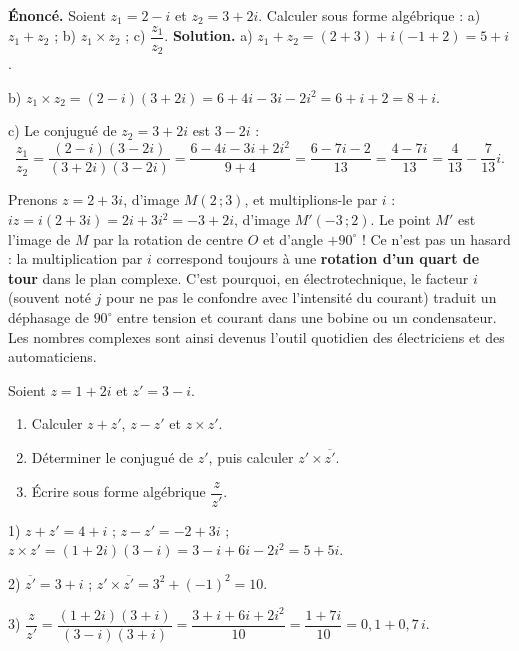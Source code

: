 \documentclass[11pt]{article}
\begin{document}
\begin{exoresolu}
\textbf{Énoncé.} Soient $z_1 = 2 - i$ et $z_2 = 3 + 2i$. Calculer sous forme algébrique : a) $z_1 + z_2$ ; b) $z_1 \times z_2$ ; c) $\dfrac{z_1}{z_2}$.
\tcblower
\textbf{Solution.}
a) $z_1 + z_2 = (2+3) + i(-1+2) = 5 + i$.

b) $z_1 \times z_2 = (2-i)(3+2i) = 6 + 4i - 3i - 2i^2 = 6 + i + 2 = 8 + i$.

c) Le conjugué de $z_2 = 3+2i$ est $3-2i$ :
\[ \frac{z_1}{z_2} = \frac{(2-i)(3-2i)}{(3+2i)(3-2i)} = \frac{6 - 4i - 3i + 2i^2}{9+4} = \frac{6 - 7i - 2}{13} = \frac{4 - 7i}{13} = \frac{4}{13} - \frac{7}{13}i. \]
\end{exoresolu}

\begin{savaistu}
Prenons $z = 2 + 3i$, d'image $M(2\,;3)$, et multiplions-le par $i$ : $iz = i(2+3i) = 2i + 3i^2 = -3 + 2i$, d'image $M'(-3\,;2)$. Le point $M'$ est l'image de $M$ par la rotation de centre $O$ et d'angle $+90^{\circ}$ ! Ce n'est pas un hasard : la multiplication par $i$ correspond toujours à une \textbf{rotation d'un quart de tour} dans le plan complexe. C'est pourquoi, en électrotechnique, le facteur $i$ (souvent noté $j$ pour ne pas le confondre avec l'intensité du courant) traduit un déphasage de $90^{\circ}$ entre tension et courant dans une bobine ou un condensateur. Les nombres complexes sont ainsi devenus l'outil quotidien des électriciens et des automaticiens.
\end{savaistu}

\begin{exercice}
Soient $z = 1 + 2i$ et $z' = 3 - i$.
\begin{enumerate}
\item Calculer $z + z'$, $z - z'$ et $z \times z'$.
\item Déterminer le conjugué de $z'$, puis calculer $z' \times \overline{z'}$.
\item Écrire sous forme algébrique $\dfrac{z}{z'}$.
\end{enumerate}
\end{exercice}

\begin{corrige}[Exercice]
1) $z + z' = 4 + i$ ; $z - z' = -2 + 3i$ ; $z \times z' = (1+2i)(3-i) = 3 - i + 6i - 2i^2 = 5 + 5i$.

2) $\overline{z'} = 3 + i$ ; $z' \times \overline{z'} = 3^2 + (-1)^2 = 10$.

3) $\dfrac{z}{z'} = \dfrac{(1+2i)(3+i)}{(3-i)(3+i)} = \dfrac{3 + i + 6i + 2i^2}{10} = \dfrac{1 + 7i}{10} = 0{,}1 + 0{,}7\,i$.
\end{corrige}
\end{document}
